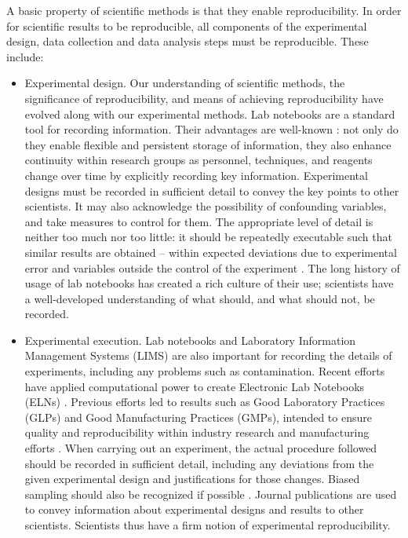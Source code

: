 A basic property of scientific methods is that they enable reproducibility.  
In order for scientific results to be reproducible, all components of the 
experimental design, data collection and data analysis steps must be 
reproducible.  These include:
\begin{itemize}

  \item Experimental design.  Our understanding of scientific methods, the 
  significance of reproducibility, and means of achieving reproducibility 
  have evolved along with our experimental methods.  
  Lab notebooks are a standard tool for recording information.  Their 
  advantages are well-known \cite{rubacha2011eln}: not only do they enable 
  flexible and persistent storage of information, they also enhance 
  continuity within research groups as personnel, techniques, 
  and reagents change over time by explicitly recording key information.
  Experimental designs must be recorded in sufficient detail to convey the key
  points to other scientists.  It may also acknowledge the possibility of 
  confounding variables, and take measures to control for them.
  The appropriate level of detail is neither too much nor too little:
  it should be repeatedly executable such that similar results are obtained 
  -- within expected deviations due to experimental error and variables 
  outside the control of the experiment \cite{drummond2012reproducible}.
  The long history of usage of lab notebooks has created a rich culture of
  their use; scientists have a well-developed understanding of what should,
  and what should not, be recorded.

  \item Experimental execution.  Lab notebooks and 
  Laboratory Information Management Systems (LIMS) 
  are also important for recording the details of experiments, including 
  any problems such as contamination.  Recent efforts have applied 
  computational power to create Electronic Lab Notebooks (ELNs)
  \cite{talbott2005eln, rubacha2011eln, myers2001eln}.
  Previous efforts led to results such as Good Laboratory Practices (GLPs) and
  Good Manufacturing Practices (GMPs), intended to ensure quality and
  reproducibility within industry research and manufacturing efforts
  \cite{macleod2008reprint, unger2008good}.
  When carrying out an experiment, the actual procedure followed should be
  recorded in sufficient detail, including any deviations from the given 
  experimental design and justifications for those changes.
  Biased sampling should also be recognized if possible
  \cite{savovic2012influence, simmons2011false}.
  Journal publications are used to convey information about experimental
  designs and results to other scientists.  Scientists thus have a firm
  notion of experimental reproducibility.


\end{itemize}
